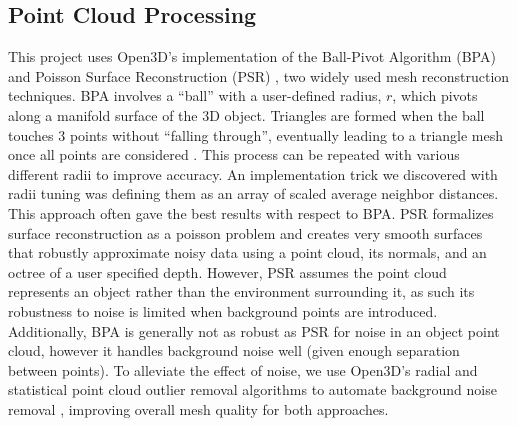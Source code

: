 \documentclass[conference,compsoc]{IEEEtran}
\begin{document}
\subsection{Point Cloud Processing}
This project uses Open3D's implementation of the Ball-Pivot Algorithm (BPA) \cite{bpa}
\cite{sr_o3d} and Poisson Surface Reconstruction (PSR) \cite{psr}\cite{sr_o3d}, 
two widely used mesh reconstruction techniques. 
BPA involves a “ball” with a user-defined radius, $r$, 
which pivots along a manifold surface of the 3D object.
Triangles are formed when the ball touches 3 points 
without “falling through”, eventually leading to a triangle mesh 
once all points are considered \cite{bpa}. This process can be 
repeated with various different radii to improve accuracy. 
An implementation trick we discovered with radii tuning was 
defining them as an array of scaled average neighbor distances. 
This approach often gave the best results with respect to BPA.
PSR \cite{psr} formalizes surface reconstruction as a 
poisson problem and creates very smooth surfaces that 
robustly approximate noisy data using a point cloud, 
its normals, and an octree of a user specified depth. 
However, PSR assumes the point cloud represents an object 
rather than the environment surrounding it, as such its 
robustness to noise is limited when background points are 
introduced. Additionally, BPA \cite{bpa} is generally 
not as robust as PSR for noise in an object point cloud, 
however it handles background noise well 
(given enough separation between points). 
To alleviate the effect of noise, we use 
Open3D's radial and statistical point cloud outlier removal 
algorithms to automate background noise removal \cite{pcr},
improving overall mesh quality for both approaches. 









\end{document}
